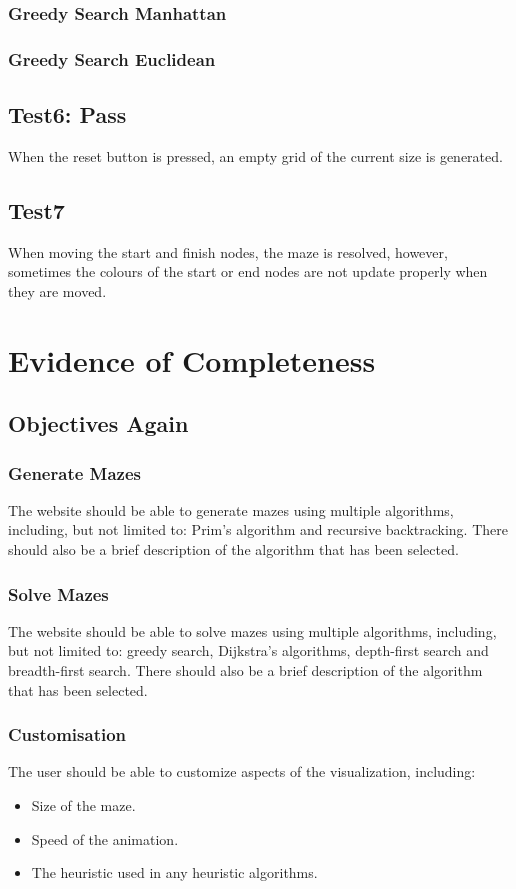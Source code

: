 \documentclass[titlepage]{article}
\begin{document}
\subsubsection{Greedy Search Manhattan}

\subsubsection{Greedy Search Euclidean}

\subsection{Test6: Pass}
When the reset button is pressed, an empty grid of the current size is generated.
\subsection{Test7}
When moving the start and finish nodes, the maze is resolved, however, sometimes the colours of the start or end nodes are not update properly when they are moved.


\section{Evidence of Completeness}  
\subsection{Objectives Again}
\subsubsection{Generate Mazes}
The website should be able to generate mazes using multiple algorithms, including, but not limited to: Prim's algorithm and recursive backtracking. There should also be a brief description of the algorithm that has been selected.

\subsubsection{Solve Mazes}
The website should be able to solve mazes using multiple algorithms, including, but not limited to: greedy search, Dijkstra's algorithms, depth-first search and breadth-first search. There should also be a brief description of the algorithm that has been selected.

\subsubsection{Customisation}
The user should be able to customize aspects of the visualization, including:
\begin{itemize}
    \item Size of the maze.
    \item Speed of the animation.
    \item The heuristic used in any heuristic algorithms.
\end{itemize}
\end{document}
